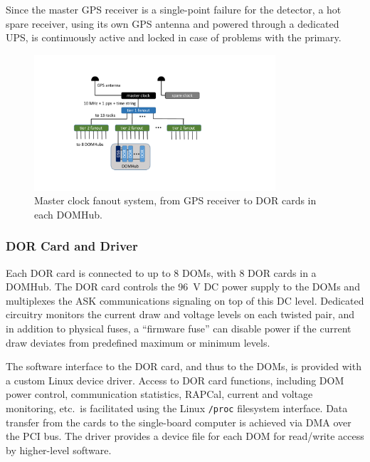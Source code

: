 Since the master GPS receiver is a single-point failure for the detector, a
hot spare receiver, using its own GPS antenna and powered through a
dedicated UPS, is continuously active and locked in case of problems with
the primary.

\begin{figure}[!h]
 \centering
 \includegraphics[width=0.8\textwidth]{graphics/online/data_readout/clock_fanout.pdf}
 \caption{Master clock fanout system, from GPS receiver to DOR cards in
   each DOMHub.}
 \label{fig:clock_fanout}
\end{figure}


\subsubsection{DOR Card and Driver}

Each DOR card is connected to up to 8 DOMs, with 8 DOR cards in a
DOMHub. The
DOR card controls the 96~V DC power supply to the DOMs and multiplexes the
ASK communications signaling on top of this DC level.  Dedicated circuitry
monitors the current draw and voltage levels on each twisted pair, and in
addition to physical fuses, a ``firmware fuse'' can disable power if the
current draw deviates from predefined maximum or minimum levels.

The software interface to the DOR card, and thus to the DOMs, is provided
with a custom Linux device driver.  Access to DOR card functions,
including DOM power control, communication statistics, RAPCal, current and
voltage monitoring, etc.~is facilitated using the Linux \texttt{/proc}
filesystem interface.  Data transfer from the cards to the single-board
computer is achieved via DMA over the PCI bus.  The driver provides a
device file for each DOM for read/write access by higher-level software.

